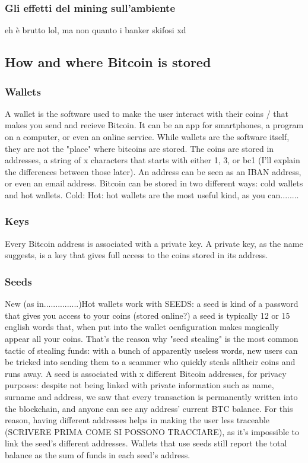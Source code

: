 \documentclass {article}
\begin{document}
\subsubsection {Gli effetti del mining sull'ambiente}

eh è brutto lol, ma non quanto i banker skifosi xd

\subsection {How and where Bitcoin is stored}

\subsubsection {Wallets}

A wallet is the software used to make the user interact with their coins / that makes you send and recieve Bitcoin. It can be an app for smartphones, a program on a computer, or even an online service.
While wallets are the software itself, they are not the "place" where bitcoins are stored. The coins are stored in addresses, a string of x characters that starts with either 1, 3, or bc1 (I'll explain the differences between those later). An address can be seen as an IBAN address, or even an email address.
Bitcoin can be stored in two different ways: cold wallets and hot wallets.
Cold:
Hot: hot wallets are the most useful kind, as you can........

\subsubsection {Keys}

Every Bitcoin address is associated with a private key.
A private key, as the name suggests, is a key that gives full access to the coins stored in its address.

\subsubsection {Seeds}

New (as in...............)Hot wallets work with SEEDS: a seed is kind of a password that gives you access to your coins (stored online?) a seed is typically 12 or 15 english words that, when put into the wallet ocnfiguration makes magically appear all your coins. That's the reason why "seed stealing" is the most common tactic of stealing funds: with a bunch of apparently useless words, new users can be tricked into sending them to a scammer who quickly steals alltheir coins and runs away.
A seed is associated with x different Bitcoin addresses, for privacy purposes: despite not being linked with private information such as name, surname and address, we saw that every transaction is permanently written into the blockchain, and anyone can see any address' current BTC balance. For this reason, having different addresses helps in making the user less traceable (SCRIVERE PRIMA COME SI POSSONO TRACCIARE), as it's impossible to link the seed's different addresses. Wallets that use seeds still report the total balance as the sum of funds in each seed's address.
\end{document}
